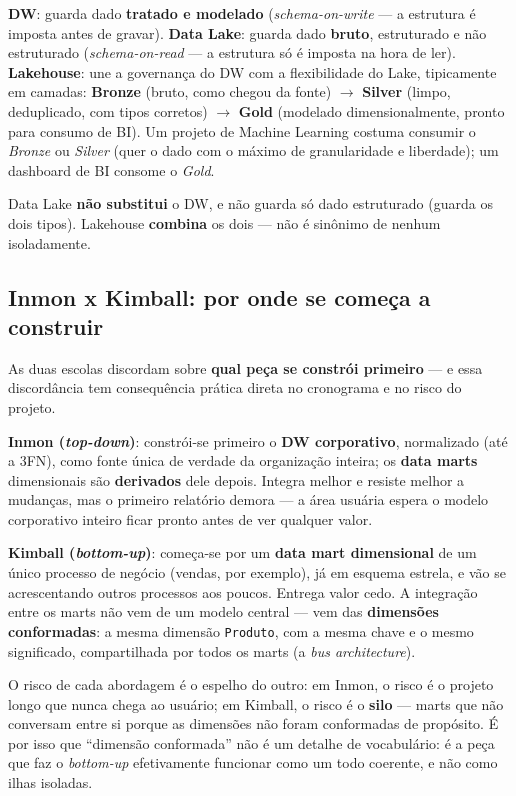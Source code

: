\begin{conceito}
\textbf{DW}: guarda dado \textbf{tratado e modelado}
(\textit{schema-on-write} --- a estrutura é imposta antes de gravar).
\textbf{Data Lake}: guarda dado \textbf{bruto}, estruturado e não
estruturado (\textit{schema-on-read} --- a estrutura só é imposta na hora
de ler). \textbf{Lakehouse}: une a governança do DW com a flexibilidade do
Lake, tipicamente em camadas: \textbf{Bronze} (bruto, como chegou da
fonte) $\to$ \textbf{Silver} (limpo, deduplicado, com tipos corretos)
$\to$ \textbf{Gold} (modelado dimensionalmente, pronto para consumo de
BI). Um projeto de Machine Learning costuma consumir o \textit{Bronze} ou
\textit{Silver} (quer o dado com o máximo de granularidade e liberdade);
um dashboard de BI consome o \textit{Gold}.
\end{conceito}

\begin{cuidado}
Data Lake \textbf{não substitui} o DW, e não guarda só dado estruturado
(guarda os dois tipos). Lakehouse \textbf{combina} os dois --- não é
sinônimo de nenhum isoladamente.
\end{cuidado}

\subsection{Inmon x Kimball: por onde se começa a construir}

\begin{conceito}
As duas escolas discordam sobre \textbf{qual peça se constrói primeiro} ---
e essa discordância tem consequência prática direta no cronograma e no
risco do projeto.

\textbf{Inmon (\textit{top-down})}: constrói-se primeiro o \textbf{DW
corporativo}, normalizado (até a 3FN), como fonte única de verdade da
organização inteira; os \textbf{data marts} dimensionais são
\textbf{derivados} dele depois. Integra melhor e resiste melhor a
mudanças, mas o primeiro relatório demora --- a área usuária espera o
modelo corporativo inteiro ficar pronto antes de ver qualquer valor.

\textbf{Kimball (\textit{bottom-up})}: começa-se por um \textbf{data mart
dimensional} de um único processo de negócio (vendas, por exemplo), já em
esquema estrela, e vão se acrescentando outros processos aos poucos.
Entrega valor cedo. A integração entre os marts não vem de um modelo
central --- vem das \textbf{dimensões conformadas}: a mesma dimensão
\texttt{Produto}, com a mesma chave e o mesmo significado, compartilhada
por todos os marts (a \textit{bus architecture}).

O risco de cada abordagem é o espelho do outro: em Inmon, o risco é o
projeto longo que nunca chega ao usuário; em Kimball, o risco é o
\textbf{silo} --- marts que não conversam entre si porque as dimensões não
foram conformadas de propósito. É por isso que “dimensão conformada” não é
um detalhe de vocabulário: é a peça que faz o \textit{bottom-up}
efetivamente funcionar como um todo coerente, e não como ilhas isoladas.
\end{conceito}

